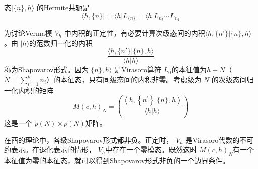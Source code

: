 态$ |\{n\},h\rangle$ 的Hermite共轭是
\begin{equation}
	\langle h,\{n\}|=\langle h| L_{\{n\}}=\langle h| L_{n_{k}} \cdots L_{n_{1}}
\end{equation}

为讨论Verma模 $V_h$ 中内积的正定性，有必要计算次级态间的内积$ \langle h,\{n'\}|\{n\},h\rangle $。由 $|h\rangle $的范数归一化的内积
$$
\frac{\langle h,\{n'\}|\{n\},h\rangle}{\langle h|h\rangle}
$$
称为Shapovarov形式。因为$ |\{n\},h\rangle$ 是Virasoro算符 $L_0 $的本征值为$h+N$（$N=\sum_{i=1}^{k} n_{i}$）的本征态，只有同级态间的内积非零。考虑级为 $N$ 的次级态间归一化内积的矩阵
\begin{equation}
	M(c, h)_{N}=\left(\frac{\left\langle h,\left\{n^{\prime}\right\} |\{n\}, h\right\rangle}{\langle h | h\rangle}\right)
\end{equation}
这是一个 $p(N)\times p(N) $矩阵。

在酉的理论中，各级Shapovarov形式都非负。正定时， $V_h$ 是Virasoro代数的不可约表示。在退化表示的情形， $V_h $中存在一个零模态。既然这时 $M(c, h)_{N} $有一个本征值为零的本征态，就可以得到Shapovarov形式非负的一个边界条件。

